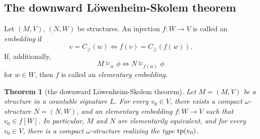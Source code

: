 \documentclass[12pt]{amsart}
\theoremstyle{plain}
\newtheorem{theorem}{Theorem}[section]
\newcommand \tp{\rm{tp}}
\begin{document}
	
	\subsection{The downward L\"owenheim-Skolem theorem}
	
	

	

	Let $(M,V)$, $(N,W)$ be structures. An injection $f:W \rightarrow V$ is called an \emph{embedding} if
	$$ v=C_{ \geq} (w) \iff f(v)=C_ {\geq} (f(w)).$$
	If, additionally,
	$$ M \models_w \phi \iff N \models_{f(w)} \phi$$
	for $w \in W$, then $f$ is called an \emph{elementary embedding}.
	
	
	\begin{theorem}[the downward L\"owenheim-Skolem theorem]
		\label{th:LS}
		Let $M = (M, V)$ be a structure in a countable signature $L$. For every $v_0 \in V$, there exists a compact $\omega$-structure $N=(N,W)$, and an elementary embedding $f: W \to V$ such that $v_0 \in f[W]$. In particular, $M$ and $N$ are elementarily equivalent, and for every $v_0 \in V$, there is a compact $\omega$-structure realizing the type $\tp(v_0)$.
	\end{theorem}
	
\end{document}
